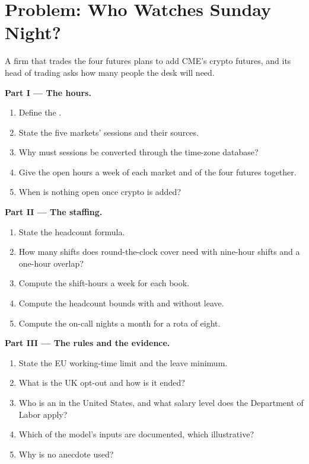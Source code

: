 \section{Problem: Who Watches Sunday Night?}

\begin{problem}\label{pb:in:hours-rhythm-and-intensity:1}
A firm that trades the four futures plans to add CME's crypto futures, and its head of trading asks how many people the
desk will need.

\medskip\noindent\textbf{Part I --- The hours.}
\begin{enumerate}
\item Define the .
\item State the five markets' sessions and their sources.
\item Why must sessions be converted through the time-zone database?
\item Give the open hours a week of each market and of the four futures together.
\item When is nothing open once crypto is added?
\end{enumerate}

\medskip\noindent\textbf{Part II --- The staffing.}
\begin{enumerate}[resume]
\item State the headcount formula.
\item How many shifts does round-the-clock cover need with nine-hour shifts and a one-hour overlap?
\item Compute the shift-hours a week for each book.
\item Compute the headcount bounds with and without leave.
\item Compute the on-call nights a month for a rota of eight.
\end{enumerate}

\medskip\noindent\textbf{Part III --- The rules and the evidence.}
\begin{enumerate}[resume]
\item State the EU working-time limit and the leave minimum.
\item What is the UK opt-out and how is it ended?
\item Who is an  in the United States, and what salary level does the Department of Labor apply?
\item Which of the model's inputs are documented, which illustrative?
\item Why is no anecdote used?
\end{enumerate}


\end{problem}
